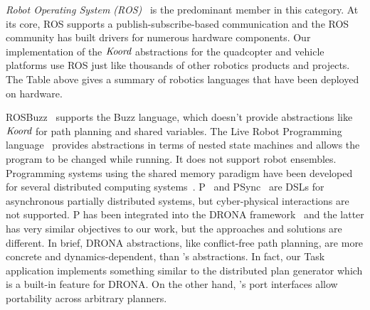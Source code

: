 %
{\em Robot Operating System (ROS)\/}~\cite{ros} is the predominant member in this category. At its core, ROS supports a publish-subscribe-based communication  and the ROS community has built drivers for  numerous hardware components.
Our implementation of the $\emph{Koord}$ abstractions for the quadcopter and vehicle platforms use ROS just like thousands of other robotics products and  projects.
 The Table above gives a summary of robotics languages that have been deployed on hardware.

 ROSBuzz~\cite{ROSBuzz} supports the Buzz language, which doesn't provide abstractions like $\emph{Koord}$ for path planning and shared variables. The Live Robot Programming language~\cite{campusanofabry:lrp2016} provides abstractions in terms of nested state machines and allows the program to be changed while running. It does not support robot ensembles. Programming systems using the shared memory paradigm have been developed for several distributed computing systems~\cite{dsm1991,Adve96sharedmemory,Azure,Cassandra,Dynamo}. 
% 
 P~\cite{Planguage} and PSync~\cite{PSyncLanguage} are DSLs for asynchronous partially distributed systems, but cyber-physical interactions are not supported. P has been integrated into the DRONA framework~\cite{desai2017drona} and the latter has very similar objectives to our work, but the approaches and solutions are different. 
 In brief, DRONA abstractions, like conflict-free path planning, are more concrete and dynamics-dependent, than \lgname's abstractions. In fact, our Task application implements something similar to the distributed plan generator which is a built-in feature for DRONA. On the other hand, \lgname's port interfaces allow portability across arbitrary planners.

%

